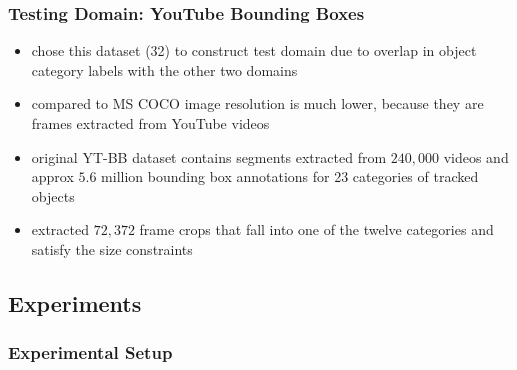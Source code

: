 \documentclass[]{article}
\begin{document}
\subsubsection{Testing Domain: YouTube Bounding Boxes}
\begin{itemize}
	\item chose this dataset (32) to construct test domain due to overlap in object category labels with the other two domains
	\item compared to MS COCO image resolution is much lower, because they are frames extracted from YouTube videos
	\item original YT-BB dataset contains segments extracted from $240,000$ videos and approx $5.6$ million bounding box annotations for 23 categories of tracked objects
	\item extracted $72,372$ frame crops that fall into one of the twelve categories and satisfy the size constraints
\end{itemize}

\subsection{Experiments}
\subsubsection{Experimental Setup}
\end{document}
